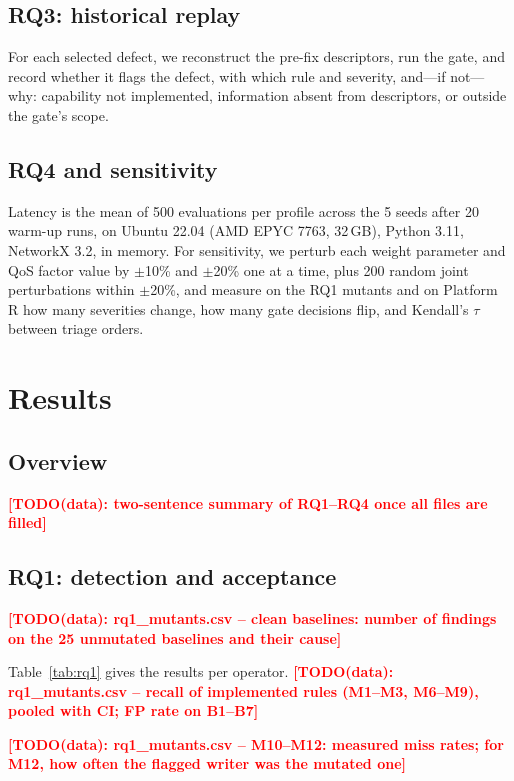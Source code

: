 \documentclass[sigconf,screen]{acmart}
\newcommand{\TODOdata}[1]{\textcolor{red}{\textbf{[TODO(data): #1]}}}
\begin{document}
\subsection{RQ3: historical replay}
For each selected defect, we reconstruct the pre-fix descriptors, run the gate, and record whether it flags the defect, with which rule and severity, and---if not---why: capability not implemented, information absent from descriptors, or outside the gate's scope.

\subsection{RQ4 and sensitivity}
Latency is the mean of 500 evaluations per profile across the 5 seeds after 20 warm-up runs, on Ubuntu 22.04 (AMD EPYC 7763, 32\,GB), Python 3.11, NetworkX 3.2, in memory. For sensitivity, we perturb each weight parameter and QoS factor value by $\pm$10\% and $\pm$20\% one at a time, plus 200 random joint perturbations within $\pm$20\%, and measure on the RQ1 mutants and on Platform R how many severities change, how many gate decisions flip, and Kendall's $\tau$ between triage orders.

\section{Results}

\subsection{Overview}
\TODOdata{two-sentence summary of RQ1--RQ4 once all files are filled}

\subsection{RQ1: detection and acceptance}
\TODOdata{rq1\_mutants.csv -- clean baselines: number of findings on the 25 unmutated baselines and their cause}

Table~\ref{tab:rq1} gives the results per operator. \TODOdata{rq1\_mutants.csv -- recall of implemented rules (M1--M3, M6--M9), pooled with CI; FP rate on B1--B7}

\TODOdata{rq1\_mutants.csv -- M10--M12: measured miss rates; for M12, how often the flagged writer was the mutated one}
\end{document}
